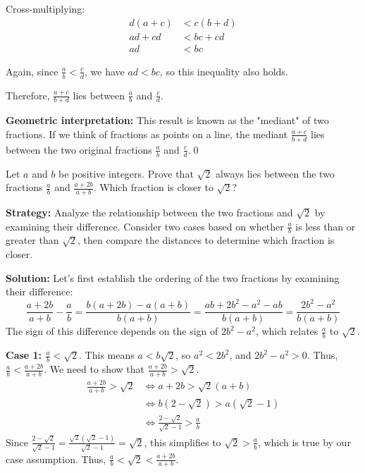 Cross-multiplying:
\begin{align*}
d(a + c) &< c(b + d) \\
ad + cd &< bc + cd \\
ad &< bc
\end{align*}

Again, since $\frac{a}{b} < \frac{c}{d}$, we have $ad < bc$, so this inequality also holds.

Therefore, $\frac{a + c}{b + d}$ lies between $\frac{a}{b}$ and $\frac{c}{d}$.

\textbf{Geometric interpretation:}
This result is known as the "mediant" of two fractions. If we think of fractions as points on a line, the mediant $\frac{a + c}{b + d}$ lies between the two original fractions $\frac{a}{b}$ and $\frac{c}{d}$.\qed


\begin{problembox}
\begin{problemstatement}
Let $a$ and $b$ be positive integers. Prove that $\sqrt{2}$ always lies between the two fractions $\frac{a}{b}$ and $\frac{a + 2b}{a + b}$. Which fraction is closer to $\sqrt{2}$?
\end{problemstatement}
\end{problembox}

\noindent\textbf{Strategy:} Analyze the relationship between the two fractions and $\sqrt{2}$ by examining their difference. Consider two cases based on whether $\frac{a}{b}$ is less than or greater than $\sqrt{2}$, then compare the distances to determine which fraction is closer.

\bigskip\noindent\textbf{Solution:}
Let's first establish the ordering of the two fractions by examining their difference:
\[
\frac{a + 2b}{a + b} - \frac{a}{b} = \frac{b(a + 2b) - a(a + b)}{b(a + b)} = \frac{ab + 2b^2 - a^2 - ab}{b(a + b)} = \frac{2b^2 - a^2}{b(a + b)}
\]
The sign of this difference depends on the sign of $2b^2 - a^2$, which relates $\frac{a}{b}$ to $\sqrt{2}$.

\textbf{Case 1: $\frac{a}{b} < \sqrt{2}$}. This means $a < b\sqrt{2}$, so $a^2 < 2b^2$, and $2b^2 - a^2 > 0$.
Thus, $\frac{a}{b} < \frac{a+2b}{a+b}$. We need to show that $\frac{a+2b}{a+b} > \sqrt{2}$.
\begin{align*}
\frac{a + 2b}{a + b} > \sqrt{2} &\iff a + 2b > \sqrt{2}(a + b)\\
&\iff b(2 - \sqrt{2}) > a(\sqrt{2} - 1)\\
&\iff \frac{2 - \sqrt{2}}{\sqrt{2} - 1} > \frac{a}{b}
\end{align*}
Since $\frac{2 - \sqrt{2}}{\sqrt{2} - 1} = \frac{\sqrt{2}(\sqrt{2} - 1)}{\sqrt{2} - 1} = \sqrt{2}$, this simplifies to $\sqrt{2} > \frac{a}{b}$, which is true by our case assumption. Thus, $\frac{a}{b} < \sqrt{2} < \frac{a + 2b}{a + b}$.

